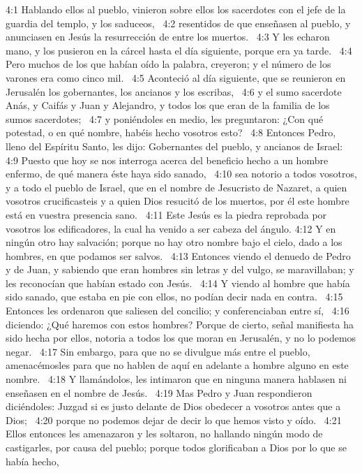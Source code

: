 4:1 Hablando ellos al pueblo, vinieron sobre ellos los sacerdotes con el jefe de la guardia del templo, y los saduceos,  
4:2 resentidos de que enseñasen al pueblo, y anunciasen en Jesús la resurrección de entre los muertos.  
4:3 Y les echaron mano, y los pusieron en la cárcel hasta el día siguiente, porque era ya tarde.  
4:4 Pero muchos de los que habían oído la palabra, creyeron; y el número de los varones era como cinco mil.  
4:5 Aconteció al día siguiente, que se reunieron en Jerusalén los gobernantes, los ancianos y los escribas,  
4:6 y el sumo sacerdote Anás, y Caifás y Juan y Alejandro, y todos los que eran de la familia de los sumos sacerdotes;  
4:7 y poniéndoles en medio, les preguntaron: ¿Con qué potestad, o en qué nombre, habéis hecho vosotros esto?  
4:8 Entonces Pedro, lleno del Espíritu Santo, les dijo: Gobernantes del pueblo, y ancianos de Israel:  
4:9 Puesto que hoy se nos interroga acerca del beneficio hecho a un hombre enfermo, de qué manera éste haya sido sanado,  
4:10 sea notorio a todos vosotros, y a todo el pueblo de Israel, que en el nombre de Jesucristo de Nazaret, a quien vosotros crucificasteis y a quien Dios resucitó de los muertos, por él este hombre está en vuestra presencia sano.  
4:11 Este Jesús es la piedra reprobada por vosotros los edificadores, la cual ha venido a ser cabeza del ángulo. 
4:12 Y en ningún otro hay salvación; porque no hay otro nombre bajo el cielo, dado a los hombres, en que podamos ser salvos.  
4:13 Entonces viendo el denuedo de Pedro y de Juan, y sabiendo que eran hombres sin letras y del vulgo, se maravillaban; y les reconocían que habían estado con Jesús.  
4:14 Y viendo al hombre que había sido sanado, que estaba en pie con ellos, no podían decir nada en contra.  
4:15 Entonces les ordenaron que saliesen del concilio; y conferenciaban entre sí,  
4:16 diciendo: ¿Qué haremos con estos hombres? Porque de cierto, señal manifiesta ha sido hecha por ellos, notoria a todos los que moran en Jerusalén, y no lo podemos negar.  
4:17 Sin embargo, para que no se divulgue más entre el pueblo, amenacémosles para que no hablen de aquí en adelante a hombre alguno en este nombre.  
4:18 Y llamándolos, les intimaron que en ninguna manera hablasen ni enseñasen en el nombre de Jesús.  
4:19 Mas Pedro y Juan respondieron diciéndoles: Juzgad si es justo delante de Dios obedecer a vosotros antes que a Dios;  
4:20 porque no podemos dejar de decir lo que hemos visto y oído.  
4:21 Ellos entonces les amenazaron y les soltaron, no hallando ningún modo de castigarles, por causa del pueblo; porque todos glorificaban a Dios por lo que se había hecho,  
